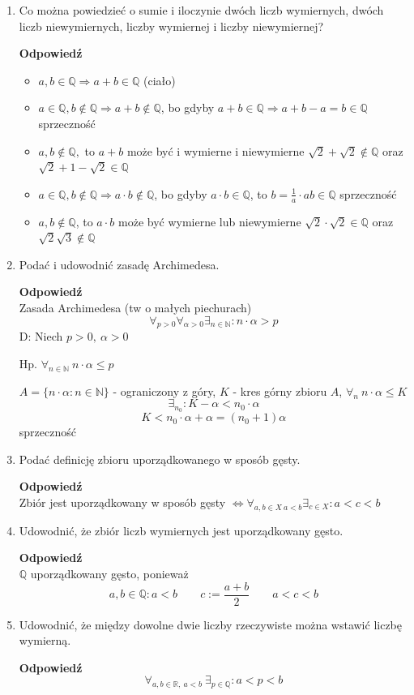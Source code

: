 \documentclass[12pt,a4paper]{article}
\theoremstyle{break}
\newcommand{\Odp}[1]{
		\begin{mdframed}[style=zadanie]
			\textbf{Odpowiedź}\\
			#1
		\end{mdframed}
	}
\newcommand{\witw}{$\Leftrightarrow$}
\begin{document}
\begin{enumerate}[1.]
	\item Co można powiedzieć o sumie i iloczynie dwóch liczb wymiernych, dwóch liczb niewymiernych, liczby wymiernej i liczby niewymiernej?
	\Odp{
	\begin{itemize}
		\item $a,b\in \mathbb{Q} \Rightarrow a+b\in \mathbb{Q}$ (ciało)
		\item $a\in \mathbb{Q}, b\notin \mathbb{Q} \Rightarrow a+b\notin\mathbb{Q}$, bo gdyby $a+b\in \mathbb{Q} \Rightarrow a+b-a=b\in\mathbb{Q}$ sprzeczność
		\item $a,b\notin\mathbb{Q},$ to $a+b$ może być i wymierne i niewymierne
		$\sqrt{2}+\sqrt{2}\notin\mathbb{Q}$ oraz $\sqrt{2}+1-\sqrt{2}\in \mathbb{Q}$
		\item $a\in\mathbb{Q}, b\notin\mathbb{Q} \Rightarrow a\cdot b \notin \mathbb{Q}$, bo gdyby $a\cdot b \in \mathbb{Q}$, to $b=\frac{1}{a} \cdot ab \in \mathbb{Q}$ sprzeczność
		\item $a,b\notin\mathbb{Q}$, to $a\cdot b$ może być wymierne lub niewymierne
		$\sqrt{2}\cdot\sqrt{2}\in \mathbb{Q}$ oraz $\sqrt{2}\sqrt{3}\notin\mathbb{Q}$
	\end{itemize}
	}
	\newpage
	\item Podać i udowodnić zasadę Archimedesa.
	\Odp{
		Zasada Archimedesa (tw o małych piechurach)
		$$\forall_{p>0} \forall_{\alpha>0} \exists_{n\in\mathbb{N}} : n\cdot\alpha>p$$
		D: Niech $p>0, \: \alpha>0$
		
		Hp. $\forall_{n\in\mathbb{N}}\: n\cdot\alpha\leq p$
		
		$A=\{n\cdot\alpha  : n\in\mathbb{N}\}$ - ograniczony z góry,
		$K$ - kres górny zbioru $A$,  $\forall_n \:n\cdot\alpha \leq K$
		$$\exists_{n_0}: K-\alpha < n_0\cdot\alpha$$
		$$K<n_0\cdot\alpha + \alpha = (n_0+1)\alpha$$ sprzeczność
	}
	
	\item Podać definicję zbioru uporządkowanego w sposób gęsty.
	\Odp{
		Zbiór jest uporządkowany w sposób gęsty \witw $\forall_{a,b\in X \: a<b} \exists_{c\in X}: a<c<b$
	}
	
	\item Udowodnić, że zbiór liczb wymiernych jest uporządkowany gęsto.
	\Odp{
		$\mathbb{Q}$ uporządkowany gęsto, ponieważ
		$$a,b\in\mathbb{Q}: a<b \qquad c:= \frac{a+b}{2} \qquad a<c<b$$
	}
	
	\item Udowodnić, że między dowolne dwie liczby rzeczywiste można wstawić liczbę wymierną.
	\Odp{
		$$\forall_{a,b\in \mathbb{R},\: a<b}\:\exists_{p\in\mathbb{Q}}: a<p<b$$
		
}
\end{enumerate}
\end{document}

